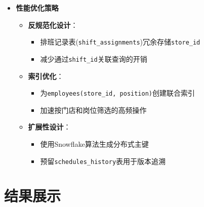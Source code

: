 \documentclass{ctexart}
\begin{document}
\begin{itemize}
    \item \textbf{性能优化策略}
    \begin{itemize}
        \item \textbf{反规范化设计}：
        \begin{itemize}
            \item 排班记录表(\texttt{shift\_assignments})冗余存储\texttt{store\_id}
            \item 减少通过\texttt{shift\_id}关联查询的开销
        \end{itemize}
        
        \item \textbf{索引优化}：
        \begin{itemize}
            \item 为\texttt{employees(store\_id, position)}创建联合索引
            \item 加速按门店和岗位筛选的高频操作
        \end{itemize}
        
        \item \textbf{扩展性设计}：
        \begin{itemize}
            \item 使用Snowflake算法生成分布式主键
            \item 预留\texttt{schedules\_history}表用于版本追溯
        \end{itemize}
    \end{itemize}
\end{itemize}


\section{结果展示}
\end{document}
